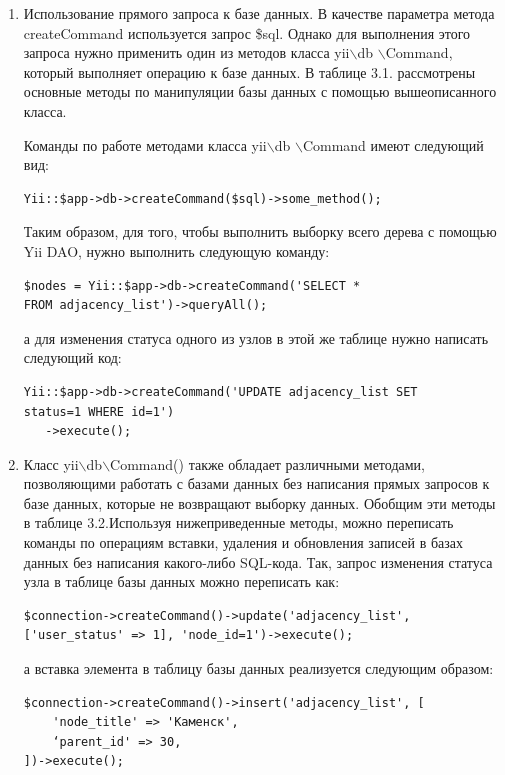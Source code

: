 \documentclass[a4paper,14pt]{extreport}
\theoremstyle{definition}
\begin{document}
 \begin{enumerate}
   \item Использование прямого запроса к базе данных. В качестве параметра метода createCommand используется запрос \$sql. Однако для выполнения этого запроса нужно применить один из методов класса  yii$\backslash$db $\backslash$Command, который выполняет операцию к базе данных. В таблице 3.1. рассмотрены основные методы по манипуляции базы данных с помощью вышеописанного класса.

       Команды по работе методами класса yii$\backslash$db $\backslash$Command имеют следующий вид:
\begin{verbatim}
Yii::$app->db->createCommand($sql)->some_method();
\end{verbatim}
Таким образом, для того, чтобы выполнить выборку всего дерева с помощью Yii DAO, нужно выполнить следующую команду:
\begin{verbatim}
$nodes = Yii::$app->db->createCommand('SELECT *
FROM adjacency_list')->queryAll();
\end{verbatim}а для изменения статуса одного из узлов в этой же таблице нужно написать следующий код:
\begin{verbatim}
Yii::$app->db->createCommand('UPDATE adjacency_list SET
status=1 WHERE id=1')
   ->execute();
\end{verbatim}
   \item Класс yii$\backslash$db$\backslash$Command() также обладает различными методами, позволяющими работать с
   базами данных без написания прямых запросов к базе данных, которые не возвращают выборку данных.
   Обобщим эти методы в таблице 3.2.Используя нижеприведенные методы, можно переписать команды по операциям вставки,
   удаления и обновления записей в базах данных без написания какого-либо SQL-кода.
 Так, запрос изменения статуса узла в таблице базы данных можно переписать как:
 \begin{verbatim}
$connection->createCommand()->update('adjacency_list',
['user_status' => 1], 'node_id=1')->execute();
\end{verbatim}
а вставка элемента в таблицу базы данных реализуется следующим образом:
\begin{verbatim}
$connection->createCommand()->insert('adjacency_list', [
    'node_title' => 'Каменск',
    ‘parent_id' => 30,
])->execute();
\end{verbatim}
\end{enumerate}
\end{document}
